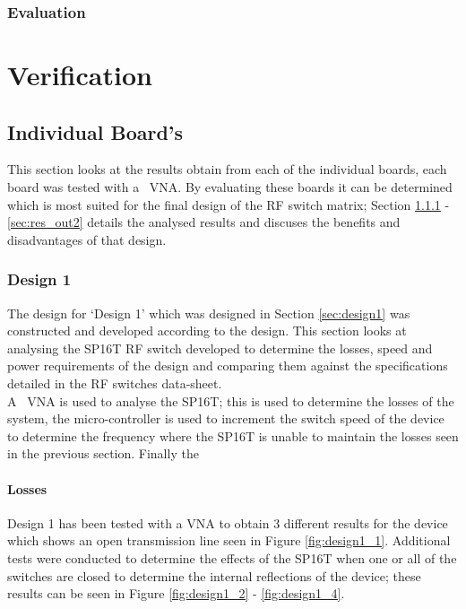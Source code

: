 \documentclass[12pt,openany,a4paper]{book}
\begin{document}
\subsection{Evaluation}











\chapter{Verification}

\section{Individual Board's}	\label{sec:indv_boards}
This section looks at the results obtain from each of the individual boards, each board was tested with a \model \ VNA. By evaluating these boards it can be determined which is most suited for the final design of the RF switch matrix; Section \ref{sec:res_des1} - \ref{sec:res_out2} details the analysed results and discuses the benefits and disadvantages of that design. 


\subsection{Design 1}	\label{sec:res_des1}
The design for `Design 1' which was designed in Section \ref{sec:design1} was constructed and developed according to the design. This section looks at analysing the SP16T RF switch developed to determine the losses, speed and power requirements of the design and comparing them against the specifications detailed in the RF switches data-sheet.\\
A \model \ VNA is used to analyse the SP16T; this is used to determine the losses of the system, the micro-controller is used to increment the switch speed of the device to determine the frequency where the SP16T is unable to maintain the losses seen in the previous section. Finally the 
 
\subsubsection{Losses}
Design 1 has been tested with a VNA to obtain $3$ different results for the device which shows an open transmission line seen in Figure \ref{fig:design1_1}. Additional tests were conducted to determine the effects of the SP16T when one or all of the switches are closed to determine the internal reflections of the device; these results can be seen in Figure \ref{fig:design1_2} - \ref{fig:design1_4}.
\end{document}
